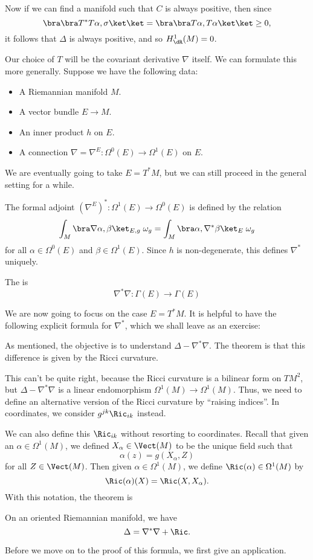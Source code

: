 \documentclass[a4paper]{article}
\begin{document}
Now if we can find a manifold such that $C$ is always positive, then since
\[
  \bra \bra T^*T \alpha, \sigma\ket\ket = \bra \bra T \alpha, T \alpha\ket\ket \geq 0,
\]
it follows that $\Delta$ is always positive, and so $H^1_{\dR}(M) = 0$.

Our choice of $T$ will be the covariant derivative $\nabla$ itself. We can formulate this more generally. Suppose we have the following data:
\begin{itemize}
  \item A Riemannian manifold $M$.
  \item A vector bundle $E \to M$.
  \item An inner product $h$ on $E$.
  \item A connection $\nabla  = \nabla^E : \Omega^0(E) \to \Omega^1(E)$ on $E$.
\end{itemize}
We are eventually going to take $E = T^*M$, but we can still proceed in the general setting for a while.

The formal adjoint $(\nabla^E)^*: \Omega^1(E) \to \Omega^0(E)$ is defined by the relation
\[
  \int_M \bra \nabla \alpha, \beta\ket_{E, g}\; \omega_g = \int_M \bra \alpha, \nabla^* \beta\ket_E\; \omega_g
\]
for all $\alpha \in \Omega^0(E)$ and $\beta \in \Omega^1(E)$. Since $h$ is non-degenerate, this defines $\nabla^*$ uniquely.

\begin{defi}
  The  is
  \[
    \nabla^* \nabla : \Gamma(E) \to \Gamma(E)
  \]
\end{defi}

We are now going to focus on the case $E = T^*M$. It is helpful to have the following explicit formula for $\nabla^*$, which we shall leave as an exercise:

As mentioned, the objective is to understand $\Delta - \nabla^* \nabla$. The theorem is that this difference is given by the Ricci curvature.

This can't be quite right, because  the Ricci curvature is a bilinear form on $TM^2$, but $\Delta - \nabla^* \nabla$ is a linear endomorphism $\Omega^1(M) \to \Omega^1(M)$. Thus, we need to define an alternative version of the Ricci curvature by ``raising indices''. In coordinates, we consider $g^{jk}\Ric_{ik}$ instead.

We can also define this $\Ric_{ik}$ without resorting to coordinates. Recall that given an $\alpha \in \Omega^1(M)$, we defined $X_\alpha \in \Vect(M)$ to be the unique field such that
\[
  \alpha(z) = g(X_\alpha, Z)
\]
for all $Z \in \Vect(M)$. Then given $\alpha \in \Omega^1(M)$, we define $\Ric(\alpha) \in \Omega^1(M)$ by
\[
  \Ric(\alpha)(X) = \Ric(X, X_\alpha).
\]
With this notation, the theorem is
\begin{thm}
  On an oriented Riemannian manifold, we have
  \[
    \Delta = \nabla^* \nabla + \Ric.
  \]
\end{thm}
Before we move on to the proof of this formula, we first give an application.
\end{document}
